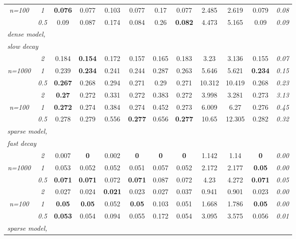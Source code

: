 \begin{table}[h!]
\begin{center}
\begin{tabular}{cc|cc|cc|cc|cc|c|c}
\it n=100  & \it  1  & {\bf 0.076} & 0.077 & 0.103 & 0.077 & 0.17 & 0.077 & 2.485 & 2.619 & 0.079 & \it  0.08 \\
& \it  0.5  & 0.09 & 0.087 & 0.174 & 0.084 & 0.26 & {\bf 0.082} & 4.473 & 5.165 & 0.09 & \it  0.09 \\[1ex]
\hline\multicolumn{2}{l|}{\it dense model,} &&&&&&&&&\\
\multicolumn{2}{l|}{\it slow decay} &&&&&&&&&\\& \it  2  & 0.184 & {\bf 0.154} & 0.172 & 0.157 & 0.165 & 0.183 & 3.23 & 3.136 & 0.155 & \it  0.07 \\
\it n=1000  & \it  1  & 0.239 & {\bf 0.234} & 0.241 & 0.244 & 0.287 & 0.263 & 5.646 & 5.621 & {\bf 0.234} & \it  0.15 \\
& \it  0.5  & {\bf 0.267} & 0.268 & 0.294 & 0.271 & 0.29 & 0.271 & 10.312 & 10.419 & 0.268 & \it  0.23 \\[1ex]
\cline{2-2}\rule{0pt}{3ex}& \it  2  & {\bf 0.27} & 0.272 & 0.331 & 0.272 & 0.383 & 0.272 & 3.998 & 3.281 & 0.273 & \it  3.13 \\
\it n=100  & \it  1  & {\bf 0.272} & 0.274 & 0.384 & 0.274 & 0.452 & 0.273 & 6.009 & 6.27 & 0.276 & \it  0.45 \\
& \it  0.5  & 0.278 & 0.279 & 0.556 & {\bf 0.277} & 0.656 & {\bf 0.277} & 10.65 & 12.305 & 0.282 & \it  0.32 \\[1ex]
\hline\multicolumn{2}{l|}{\it sparse model,} &&&&&&&&&\\
\multicolumn{2}{l|}{\it fast decay} &&&&&&&&&\\& \it  2  & 0.007 & {\bf 0} & 0.002 & {\bf 0} & {\bf 0} & {\bf 0} & 1.142 & 1.14 & {\bf 0} & \it  0.00 \\
\it n=1000  & \it  1  & 0.053 & 0.052 & 0.052 & 0.051 & 0.057 & 0.052 & 2.172 & 2.177 & {\bf 0.05} & \it  0.00 \\
& \it  0.5  & {\bf 0.071} & {\bf 0.071} & 0.072 & {\bf 0.071} & 0.087 & 0.072 & 4.23 & 4.272 & {\bf 0.071} & \it  0.05 \\[1ex]
\cline{2-2}\rule{0pt}{3ex}& \it  2  & 0.027 & 0.024 & {\bf 0.021} & 0.023 & 0.027 & 0.037 & 0.941 & 0.901 & 0.023 & \it  0.00 \\
\it n=100  & \it  1  & {\bf 0.05} & {\bf 0.05} & 0.052 & {\bf 0.05} & 0.103 & 0.051 & 1.668 & 1.786 & {\bf 0.05} & \it  0.00 \\
& \it  0.5  & {\bf 0.053} & 0.054 & 0.094 & 0.055 & 0.172 & 0.054 & 3.095 & 3.575 & 0.056 & \it  0.01 \\[1ex]
\hline\multicolumn{2}{l|}{\it sparse model,} &&&&&&&&&\\

\end{tabular}
\end{center}
\end{table}
